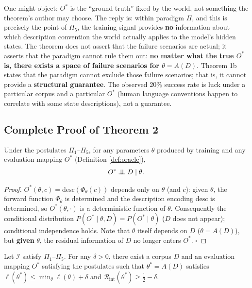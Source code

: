 \begin{remark}
One might object: $O^{*}$ is the ``ground truth'' fixed by the world, not something the
theorem's author may choose. The reply is: within paradigm $\Pi$, and this is precisely the
point of $\Pi_5$, the training signal provides \textbf{no} information about which
description convention the world actually applies to the model's hidden states. The theorem
does not assert that the failure scenarios are actual; it asserts that the paradigm cannot
rule them out: \textbf{no matter what the true $O^{*}$ is, there exists a space of failure
scenarios for $\theta = A(D)$}. Theorem 1b states that the paradigm cannot exclude those
failure scenarios; that is, it cannot provide a \textbf{structural guarantee}. The observed
20\% success rate is luck under a particular corpus and a particular $O^{*}$ (human language
conventions happen to correlate with some state descriptions), not a guarantee.
\end{remark}

\subsection{Complete Proof of Theorem 2}

\begin{lemma}\label{lem:oracle-indep}
Under the postulates $\Pi_1$--$\Pi_5$, for any parameters $\theta$ produced by training and
any evaluation mapping $O^{*}$ (Definition \ref{def:oracle}),
\begin{equation}
O^{*} \perp\!\!\!\perp D \mid \theta .
\label{eq:lem-oracle}
\end{equation}
\end{lemma}

\begin{proof}
$O^{*}(\theta, c) = \mathrm{desc}(\Phi_\theta(c))$ depends only on $\theta$ (and $c$):
given $\theta$, the forward function $\Phi_\theta$ is determined and the description encoding
$\mathrm{desc}$ is determined, so $O^{*}(\theta, \cdot)$ is a deterministic function of
$\theta$. Consequently the conditional distribution $P(O^{*} \mid \theta, D) = P(O^{*} \mid \theta)$
($D$ does not appear); conditional independence holds. Note that $\theta$ itself depends on
$D$ ($\theta = A(D)$), but \textbf{given} $\theta$, the residual information of $D$ no longer
enters $O^{*}$. $\square$
\end{proof}

\begin{restate}[Theorem 2a]
Let $\mathcal{I}$ satisfy $\Pi_1$--$\Pi_5$. For any $\delta > 0$, there exist a corpus $D$
and an evaluation mapping $O^{*}$ satisfying the postulates such that $\theta^{*} = A(D)$
satisfies $\ell(\theta^{*}) \le \min_\theta \ell(\theta) + \delta$ and
$\mathcal{R}_{\mathrm{int}}(\theta^{*}) \ge \tfrac12 - \delta$.
\end{restate}

